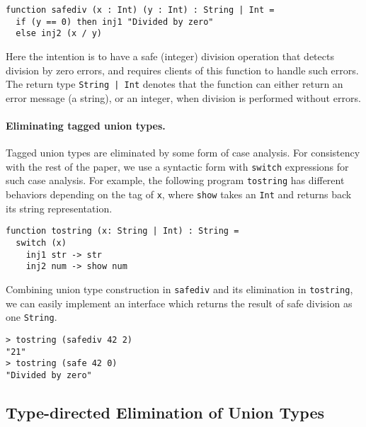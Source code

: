 \begin{lstlisting}
function safediv (x : Int) (y : Int) : String | Int =
  if (y == 0) then inj1 "Divided by zero"
  else inj2 (x / y)
\end{lstlisting}

\noindent Here the intention is to have a safe (integer) division operation that detects
division by zero errors, and requires clients of this function to handle
such errors. The return type \lstinline{String | Int} denotes that the function
can either return an error message (a string), or an integer, when division
is performed without errors.

\paragraph{Eliminating tagged union types.}
Tagged union types are eliminated by some form of case analysis.
For consistency with the rest of the paper, we use a syntactic form with
\lstinline{switch} expressions for such case analysis. For example,
the following program \lstinline{tostring} has different behaviors depending on the
tag of \lstinline{x}, where \lstinline{show} takes an \lstinline{Int} and
returns back its string representation.

\begin{lstlisting}
function tostring (x: String | Int) : String =
  switch (x)
    inj1 str -> str
    inj2 num -> show num
\end{lstlisting}

Combining union type construction in \lstinline{safediv} and its elimination in
\lstinline{tostring}, we can easily implement an interface which returns the
result of safe division as one \lstinline{String}.

\begin{lstlisting}
> tostring (safediv 42 2)
"21"
> tostring (safe 42 0)
"Divided by zero"
\end{lstlisting}


\subsection{Type-directed Elimination of Union Types}\label{subsec:elimination}



